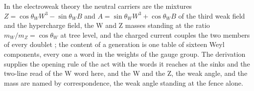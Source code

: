 \begin{chbridge}
In the electroweak theory the neutral carriers are the mixtures $Z = \cos\theta_W W^3 - \sin\theta_W B$ and $A = \sin\theta_W W^3 + \cos\theta_W B$ of the third weak field and the hypercharge field, the W and Z masses standing at the ratio $m_W/m_Z = \cos\theta_W$ at tree level, and the charged current couples the two members of every doublet \cite{Glashow1961,Weinberg1967}; the content of a generation is one table of sixteen Weyl components, every one a word in the weights of the gauge group. The derivation supplies the opening rule of the act with the words it reaches at the sinks and the two-line read of the W word here, and the W and the Z, the weak angle, and the mass are named by correspondence, the weak angle standing at the fence alone.
\end{chbridge}
